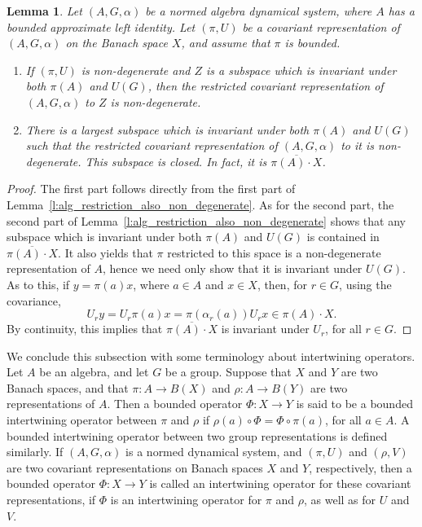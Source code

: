 \documentclass{amsart}
\theoremstyle{plain}
\newtheorem{lemma}[theorem]{Lemma}
\theoremstyle{definition}
\numberwithin{equation}{section}
\begin{document}
\begin{lemma}\label{l:dyn_sys_restriction_also_non_degenerate}
 Let ${(A,G,\alpha)}$ be a normed algebra dynamical system, where $A$ has a bounded approximate left identity. Let ${(\pi,U)}$ be a covariant representation of ${(A,G,\alpha)}$ on the Banach space $X$, and assume that $\pi$ is bounded.
\begin{enumerate}
 \item If $(\pi,U)$ is non-degenerate and $Z$ is a subspace which is invariant under both $\pi(A)$ and $U(G)$, then the restricted covariant representation of ${(A,G,\alpha)}$ to $Z$ is non-degenerate.
\item There is a largest subspace which is invariant under both $\pi(A)$ and $U(G)$ such that the restricted covariant representation of ${(A,G,\alpha)}$ to it is non-degenerate. This subspace is closed. In fact, it is $\overline{\pi(A)\cdot X}$.
\end{enumerate}
\end{lemma}

\begin{proof}
The first part follows directly from the first part of Lemma~\ref{l:alg_restriction_also_non_degenerate}.
As for the second part, the second part of Lemma~\ref{l:alg_restriction_also_non_degenerate} shows that any subspace which is invariant under both $\pi(A)$ and $U(G)$ is contained in $\overline{\pi(A)\cdot X}$. It also yields that $\pi$ restricted to this space is a non-degenerate representation of $A$, hence we need only show that it is invariant under $U(G)$. As to this, if $y = \pi(a)x$, where $a \in A$ and $x \in X$, then, for $r \in G$, using the covariance,
\[ U_r y = U_r \pi(a)x = \pi(\alpha_r(a))U_r x \in \pi(A)\cdot X. \]
By continuity, this implies that $\overline{\pi(A)\cdot X}$ is invariant under $U_r$, for all $r \in G$.
\end{proof}

We conclude this subsection with some terminology about intertwining operators. Let $A$ be an algebra, and let $G$ be a group. Suppose that $X$ and $Y$ are two Banach spaces, and that $\pi:A\to B(X)$ and $\rho:A\to B(Y)$ are two representations of $A$. Then a bounded operator $\Phi:X\to Y$ is said to be a bounded intertwining operator between $\pi$ and $\rho$ if $\rho(a) \circ \Phi = \Phi \circ \pi(a)$, for all $a\in A$. A bounded intertwining operator between two group representations is defined similarly. If ${(A,G,\alpha)}$ is a normed dynamical system, and ${(\pi,U)}$ and $(\rho, V)$ are two covariant representations on Banach spaces $X$ and $Y$, respectively, then a bounded operator $\Phi: X \to Y$ is called an intertwining operator for these covariant representations, if $\Phi$ is an intertwining operator for $\pi$ and $\rho$, as well as for $U$ and $V$.
\end{document}
